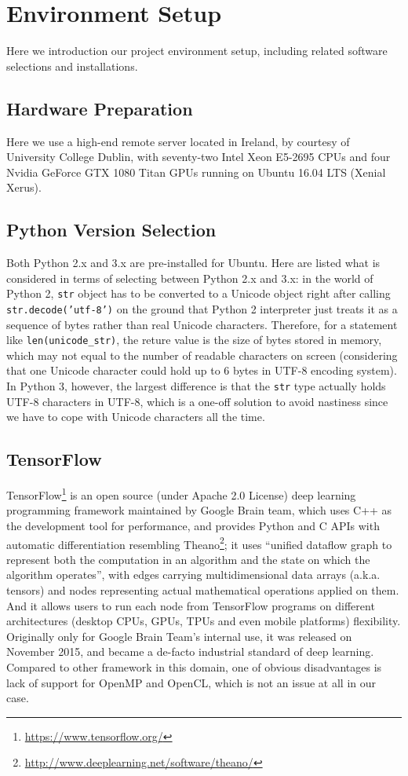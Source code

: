 \chapter{Environment Setup}\label{ch:setup}
Here we introduction our project environment setup, including related software selections and installations.

\section{Hardware Preparation}
Here we use a high-end remote server located in Ireland, by courtesy of University College Dublin, with seventy-two Intel Xeon\textsuperscript{\textregistered} E5-2695 CPUs and four Nvidia GeForce\textsuperscript{\textregistered} GTX 1080 Titan GPUs running on Ubuntu 16.04 LTS (Xenial Xerus).

\section{Python Version Selection}
Both Python 2.x and 3.x are pre-installed for Ubuntu. Here are listed what is considered in terms of selecting between Python 2.x and 3.x: in the world of Python 2, \texttt{str} object has to be converted to a Unicode object right after calling \texttt{str.decode('utf-8')} on the ground that Python 2 interpreter just treats it as a sequence of bytes rather than real Unicode characters. Therefore, for a statement like \texttt{len(unicode\_str)}, the reture value is the size of bytes stored in memory, which may not equal to the number of readable characters on screen (considering that one Unicode character could hold up to 6 bytes in UTF-8 encoding system). In Python 3, however, the largest difference is that the \texttt{str} type actually holds UTF-8 characters in UTF-8, which is a one-off solution to avoid nastiness since we have to cope with Unicode characters all the time.

\section{TensorFlow}
TensorFlow\footnote{\url{https://www.tensorflow.org/}} is an open source (under Apache 2.0 License) deep learning programming framework maintained by Google Brain team, which uses C++ as the development tool for performance, and provides Python and C APIs with automatic differentiation resembling Theano\footnote{\url{http://www.deeplearning.net/software/theano/}}; it uses ``unified dataflow graph to represent both the computation in an algorithm and the state on which the algorithm operates''\cite{DBLP:journals/corr/AbadiBCCDDDGIIK16}, with edges carrying multidimensional data arrays (a.k.a. tensors) and nodes representing actual mathematical operations applied on them. And it allows users to run each node from TensorFlow programs on different architectures (desktop CPUs, GPUs, TPUs and even mobile platforms) flexibility. Originally only for Google Brain Team's internal use, it was released on November 2015, and became a de-facto industrial standard of deep learning. Compared to other framework in this domain, one of obvious disadvantages is lack of support for OpenMP and OpenCL, which is not an issue at all in our case.

